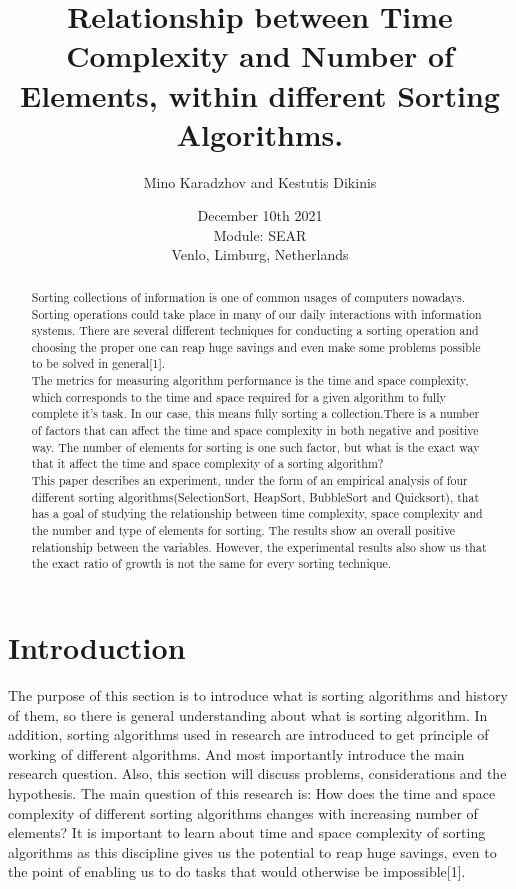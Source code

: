 \documentclass[]{report}
\title{Relationship between Time Complexity and Number of Elements, within different Sorting Algorithms.}
\author{Mino Karadzhov and Kestutis Dikinis}
\date{December 10th 2021 \\Module: SEAR \\Venlo, Limburg, Netherlands}
\begin{document}
\maketitle

\begin{abstract}
Sorting  collections of information is one of common usages of computers nowadays. Sorting operations could take place in many of our daily interactions with information systems. There are several different techniques for conducting a sorting operation and choosing the proper one can reap huge savings and even make some problems possible to be solved in general[1]. \\

The metrics for measuring algorithm performance is the time and space complexity, which corresponds to the time and space required for a given algorithm to fully complete it's task. In our case, this means fully sorting a collection.There is a number of factors that can affect the time and space complexity in both negative and positive way. The number of elements for sorting is one such factor, but what is the exact way that it affect the time and space complexity of a sorting algorithm? \\

This paper describes an experiment, under the form of an empirical analysis of four different sorting algorithms(SelectionSort, HeapSort, BubbleSort and Quicksort), that has a goal of studying the relationship between time complexity, space complexity and the number and type of elements for sorting. The results show an overall positive relationship between the variables. However, the experimental results also show us that the exact ratio of growth is not the same for every sorting technique.

\end{abstract}

\tableofcontents
\setcounter{page}{3}
\listoffigures %
\pagebreak

	
\section{Introduction}
The purpose of this section is to introduce what is sorting algorithms and history of them, so there is general understanding about what is sorting algorithm. In addition, sorting algorithms used in research are introduced to get principle of working of different algorithms. And most importantly introduce the main research question. Also, this section will discuss problems, considerations and the hypothesis.
The main question of this research is: How does the time and space complexity of different sorting algorithms changes with increasing number of elements? It is important to learn about time and space complexity of sorting algorithms as this discipline gives us the potential to reap huge savings, even to the point of enabling us to do tasks that would otherwise be impossible[1]. 
\end{document}
